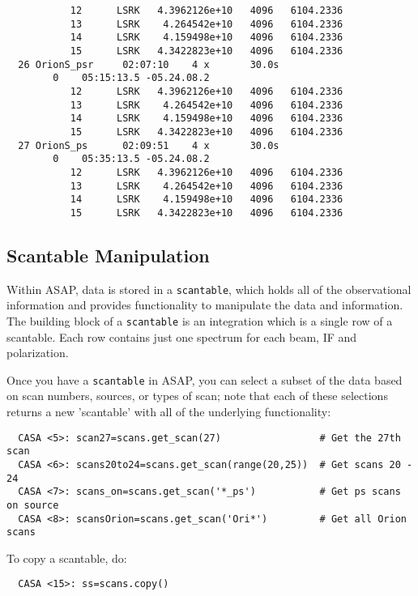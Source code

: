\begin{verbatim}
           12      LSRK   4.3962126e+10   4096   6104.2336
           13      LSRK    4.264542e+10   4096   6104.2336
           14      LSRK    4.159498e+10   4096   6104.2336
           15      LSRK   4.3422823e+10   4096   6104.2336
  26 OrionS_psr     02:07:10    4 x       30.0s
        0    05:15:13.5 -05.24.08.2
           12      LSRK   4.3962126e+10   4096   6104.2336
           13      LSRK    4.264542e+10   4096   6104.2336
           14      LSRK    4.159498e+10   4096   6104.2336
           15      LSRK   4.3422823e+10   4096   6104.2336
  27 OrionS_ps      02:09:51    4 x       30.0s
        0    05:35:13.5 -05.24.08.2
           12      LSRK   4.3962126e+10   4096   6104.2336
           13      LSRK    4.264542e+10   4096   6104.2336
           14      LSRK    4.159498e+10   4096   6104.2336
           15      LSRK   4.3422823e+10   4096   6104.2336
\end{verbatim}
\normalsize


\subsection{Scantable Manipulation}
\label{subsection:sd.asap.scantable}

Within ASAP, data is stored in a {\tt scantable}, which holds all of the
observational information and provides functionality to manipulate the
data and information. The building block of a {\tt scantable} is an
integration which is a single row of a scantable. Each row contains
just one spectrum for each beam, IF and polarization.  

Once you have a {\tt scantable} in ASAP, you can select a subset of the
data based on scan numbers, sources, or types of scan; note that each
of these selections returns a new 'scantable' with all of the 
underlying functionality: 

\small
\begin{verbatim}
  CASA <5>: scan27=scans.get_scan(27)                 # Get the 27th scan
  CASA <6>: scans20to24=scans.get_scan(range(20,25))  # Get scans 20 - 24
  CASA <7>: scans_on=scans.get_scan('*_ps')           # Get ps scans on source
  CASA <8>: scansOrion=scans.get_scan('Ori*')         # Get all Orion scans
\end{verbatim}
\normalsize

To copy a scantable, do:

\small
\begin{verbatim}
  CASA <15>: ss=scans.copy()
\end{verbatim}
\normalsize

